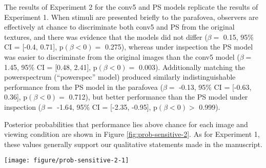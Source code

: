 \documentclass[doc, 11pt,a4paper,natbib]{apa6}\usepackage[]{graphicx}\usepackage[]{color}
\makeatletter
\def\maxwidth{ %
  \ifdim\Gin@nat@width>\linewidth
    \linewidth
  \else
    \Gin@nat@width
  \fi
}
\newenvironment{knitrout}{}{} %
\makeatother
\begin{document}
The results of Experiment 2 for the conv5 and PS models replicate the results of Experiment 1. 
When stimuli are presented briefly to the parafovea, observers are effectively at chance to discriminate both conv5 and PS from the original textures, and there was evidence that the models did not differ
($\beta = $ 0.15, 95\% CI = [-0.4, 0.71], $\mathrm{p}(\beta < 0) = $ 0.275), 
whereas under inspection the PS model was easier to discriminate from the original images than the conv5 model
($\beta = $ 1.45, 95\% CI = [0.48, 2.41], $\mathrm{p}(\beta < 0) = $ 0.003).
Additionally matching the powerspectrum (``powerspec'' model) produced similarly indistinguishable performance from the PS model in the parafovea
($\beta = $ -0.13, 95\% CI = [-0.63, 0.36], $\mathrm{p}(\beta < 0) = $ 0.712),
but better performance than the PS model under inspection
($\beta = $ -1.64, 95\% CI = [-2.35, -0.95], $\mathrm{p}(\beta < 0) > $ 0.999).

Posterior probabilities that performance lies above chance for each image and viewing condition are shown in Figure \ref{fig:prob-sensitive-2}. 
As for Experiment 1, these values generally support our qualitative statements made in the manuscript.




\begin{knitrout}
\color{fgcolor}\begin{figure*}
\texttt{[image: figure/prob-sensitive-2-1]} \caption{Posterior probability that performance for each image in Experiment 2 lies above chance.
              Plot elements as in Figure \ref{fig:prob-sensitive-1}.}\label{fig:prob-sensitive-2}
\end{figure*}


\end{knitrout}

\end{document}
